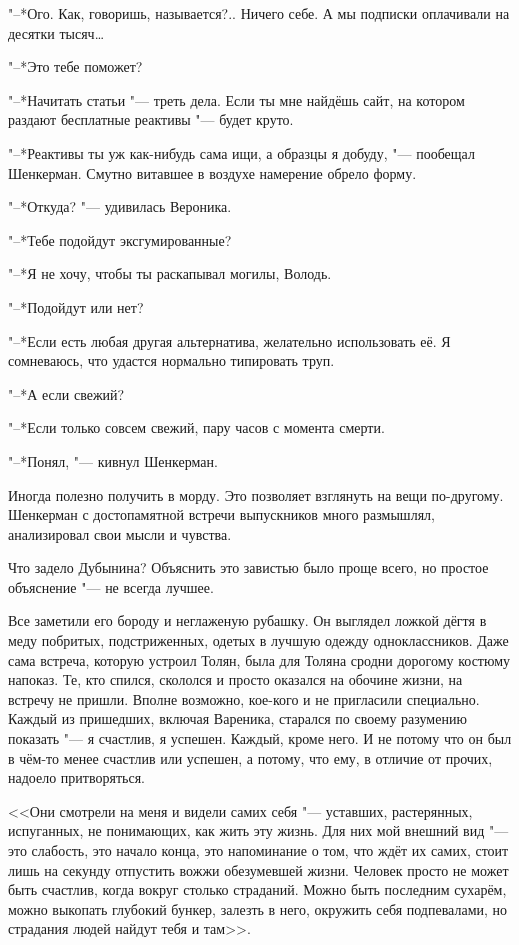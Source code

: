 "--*Ого.
Как, говоришь, называется?..
Ничего себе.
А мы подписки оплачивали на десятки тысяч\dots{}

"--*Это тебе поможет?

"--*Начитать статьи "--- треть дела.
Если ты мне найдёшь сайт, на котором раздают бесплатные реактивы "--- будет круто.

"--*Реактивы ты уж как-нибудь сама ищи, а образцы я добуду, "--- пообещал Шенкерман.
Смутно витавшее в воздухе намерение обрело форму.

"--*Откуда? "--- удивилась Вероника.

"--*Тебе подойдут эксгумированные?

"--*Я не хочу, чтобы ты раскапывал могилы, Володь.

"--*Подойдут или нет?

"--*Если есть любая другая альтернатива, желательно использовать её.
Я сомневаюсь, что удастся нормально типировать труп.

"--*А если свежий?

"--*Если только совсем свежий, пару часов с момента смерти.

"--*Понял, "--- кивнул Шенкерман.

\asterism

Иногда полезно получить в морду.
Это позволяет взглянуть на вещи по-другому.
Шенкерман с достопамятной встречи выпускников много размышлял, анализировал свои мысли и чувства.

Что задело Дубынина?
Объяснить это завистью было проще всего, но простое объяснение "--- не всегда лучшее.

Все заметили его бороду и неглаженую рубашку.
Он выглядел ложкой дёгтя в меду побритых, подстриженных, одетых в лучшую одежду одноклассников.
Даже сама встреча, которую устроил Толян, была для Толяна сродни дорогому костюму напоказ.
Те, кто спился, скололся и просто оказался на обочине жизни, на встречу не пришли.
Вполне возможно, кое-кого и не пригласили специально.
Каждый из пришедших, включая Вареника, старался по своему разумению показать "--- я счастлив, я успешен.
Каждый, кроме него.
И не потому что он был в чём-то менее счастлив или успешен, а потому, что ему, в отличие от прочих, надоело притворяться.

<<Они смотрели на меня и видели самих себя "--- уставших, растерянных, испуганных, не понимающих, как жить эту жизнь.
Для них мой внешний вид "--- это слабость, это начало конца, это напоминание о том, что ждёт их самих, стоит лишь на секунду отпустить вожжи обезумевшей жизни.
Человек просто не может быть счастлив, когда вокруг столько страданий.
Можно быть последним сухарём, можно выкопать глубокий бункер, залезть в него, окружить себя подпевалами, но страдания людей найдут тебя и там>>.

